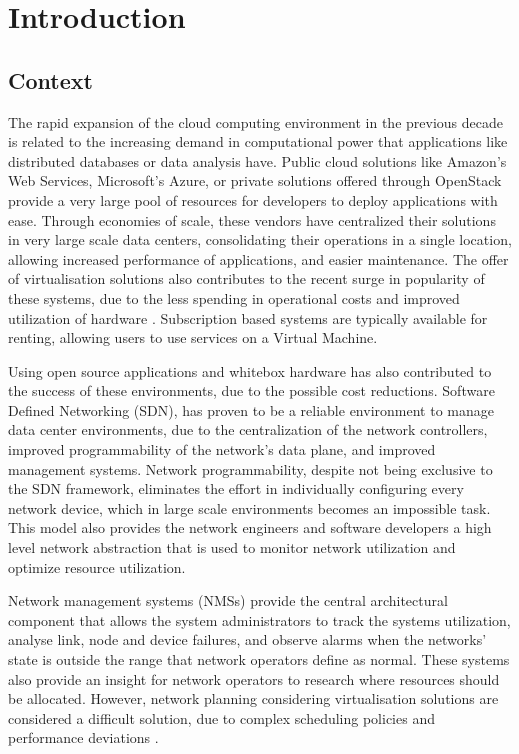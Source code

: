 \chapter{Introduction} \label{chap:introduction} 

\section {Context} \label{context}

The rapid expansion of the cloud computing environment in the previous decade is related to the increasing demand in computational power that applications like 
distributed databases or data analysis have. Public cloud solutions like Amazon's Web Services, Microsoft's Azure, or private solutions offered through OpenStack
provide a very large pool of resources for developers to deploy applications with ease. Through economies of scale, these vendors have
centralized their solutions in very large scale data centers, consolidating their operations in a single location, allowing increased performance of applications, and
easier maintenance. The offer of virtualisation solutions also contributes to the recent surge in popularity of these systems, due to the less spending in
operational costs and improved utilization of hardware \cite{sims_david_carousels_2011}. Subscription based systems are typically available for renting, allowing 
users to use services on a Virtual Machine.

\par Using open source applications and whitebox hardware has also contributed to the success of these environments, due to the possible cost reductions. Software
Defined Networking (SDN), has proven to be a reliable environment to manage data center environments, due to the centralization of the network
controllers, improved programmability of the network's data plane, and improved management systems. Network programmability, despite not being exclusive to the 
SDN framework, eliminates the effort in individually configuring every network device, which in large scale environments becomes an impossible task. This model
also provides the network engineers and software developers a high level network abstraction that is used to monitor network utilization and optimize resource
utilization. 

\par Network management systems (NMSs) provide the central architectural component that allows the system administrators to track the systems utilization, 
analyse link, node and device failures, and observe alarms when the networks' state is outside the range that network operators define as normal. These systems
also provide an insight for network operators to research where resources should be allocated. However, network planning considering virtualisation solutions 
are considered a difficult solution, due to complex scheduling policies and performance deviations \cite{sampaio_energy-efficient_2015}. 

